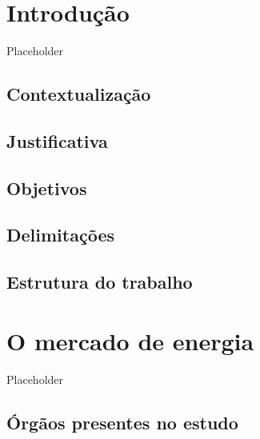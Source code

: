 \documentclass[grad,numbers]{coppe}
\begin{document}
  \listoffigures

  \listoftables

  \printlosymbols
  \printloabbreviations

  \mainmatter

  \hypertarget{introduuxe7uxe3o}{%
  \chapter{Introdução}\label{introduuxe7uxe3o}}

  Placeholder

  \hypertarget{contextualizauxe7uxe3o}{%
  \section{Contextualização}\label{contextualizauxe7uxe3o}}

  \hypertarget{justificativa}{%
  \section{Justificativa}\label{justificativa}}

  \hypertarget{objetivos}{%
  \section{Objetivos}\label{objetivos}}

  \hypertarget{delimitauxe7uxf5es}{%
  \section{Delimitações}\label{delimitauxe7uxf5es}}

  \hypertarget{estrutura-do-trabalho}{%
  \section{Estrutura do trabalho}\label{estrutura-do-trabalho}}

  \hypertarget{o-mercado-de-energia}{%
  \chapter{O mercado de energia}\label{o-mercado-de-energia}}

  Placeholder

  \hypertarget{uxf3rguxe3os-presentes-no-estudo}{%
  \section{Órgãos presentes no estudo}\label{uxf3rguxe3os-presentes-no-estudo}}
\end{document}
